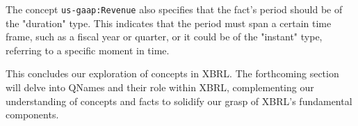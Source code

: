 
The concept \texttt{us-gaap:Revenue} also specifies that the fact's period should be of the "duration" type.
This indicates that the period must span a certain time frame, such as a fiscal year or quarter,
or it could be of the "instant" type, referring to a specific moment in time.


This concludes our exploration of concepts in XBRL.
The forthcoming section will delve into QNames and their role within XBRL,
complementing our understanding of concepts and facts to solidify our grasp of XBRL's fundamental components.